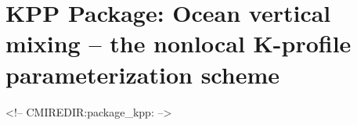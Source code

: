 \section{KPP Package: Ocean vertical mixing -- 
the nonlocal K-profile parameterization scheme}

\label{sec:pkg:kpp}
\begin{rawhtml}
<!-- CMIREDIR:package_kpp: -->
\end{rawhtml}
